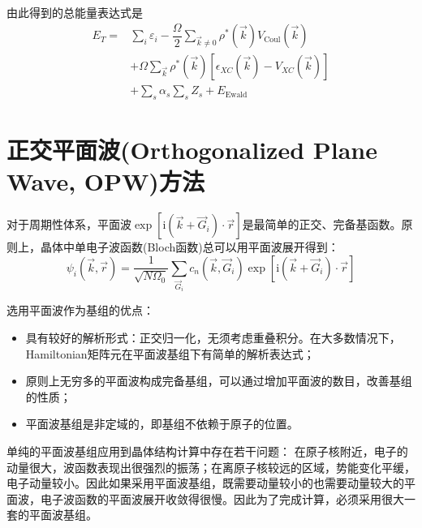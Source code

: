 由此得到的总能量表达式是
\begin{equation}
	\begin{aligned}
		E_T=&\sum_i\varepsilon_i-\dfrac{\Omega}2\sum_{\vec k\neq0}\rho^{\ast}(\vec k)V_{\mathrm{Coul}}(\vec k)\\
		&+\Omega\sum_{\vec k}\rho^{\ast}(\vec k)[\epsilon_{XC}(\vec k)-V_{XC}(\vec k)]\\
		&+\sum_s\alpha_s\sum_sZ_s+E_{\mathrm{Ewald}}
	\end{aligned}
\end{equation}

\section{正交平面波(Orthogonalized Plane Wave, OPW)方法}
对于周期性体系，平面波$\exp[\mathrm{i}(\vec k+\vec G_i)\cdot\vec r]$是最简单的正交、完备基函数。原则上，晶体中单电子波函数(Bloch函数)总可以用平面波展开得到：
\begin{equation}
	\psi_i(\vec k,\vec r)=\frac1{\sqrt{N\Omega_0}}\sum_{\vec G_i}c_n(\vec k,\vec G_i)\exp[\mathrm{i}(\vec k+\vec G_i)\cdot\vec r]
  \label{eq:solid-84}
\end{equation}

选用平面波作为基组的优点：
\begin{itemize}
	\item 具有较好的解析形式：正交归一化，无须考虑重叠积分。在大多数情况下， Hamiltonian矩阵元在平面波基组下有简单的解析表达式；
	\item 原则上无穷多的平面波构成完备基组，可以通过增加平面波的数目，改善基组的性质；
	\item 平面波基组是非定域的，即基组不依赖于原子的位置。
\end{itemize}

单纯的平面波基组应用到晶体结构计算中存在若干问题：%
在原子核附近，电子的动量很大，波函数表现出很强烈的振荡；在离原子核较远的区域，势能变化平缓，电子动量较小。因此如果采用平面波基组，既需要动量较小的也需要动量较大的平面波，电子波函数的平面波展开收敛得很慢。因此为了完成计算，必须采用很大一套的平面波基组。

